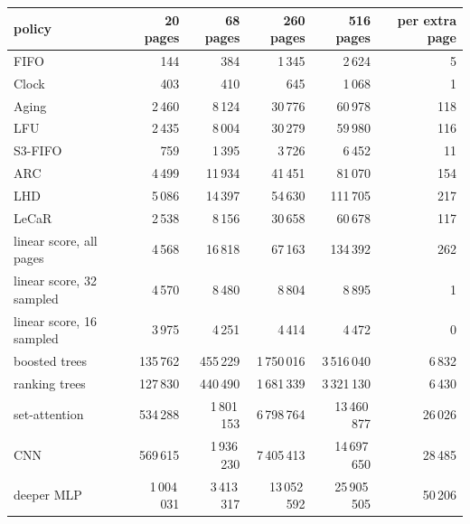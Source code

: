 \begin{tabular}{lrrrrr}
\toprule
policy & 20 pages & 68 pages & 260 pages & 516 pages & per extra page \\
\midrule
FIFO & 144 & 384 & 1\,345 & 2\,624 & 5 \\
Clock & 403 & 410 & 645 & 1\,068 & 1 \\
Aging & 2\,460 & 8\,124 & 30\,776 & 60\,978 & 118 \\
LFU & 2\,435 & 8\,004 & 30\,279 & 59\,980 & 116 \\
S3-FIFO & 759 & 1\,395 & 3\,726 & 6\,452 & 11 \\
ARC & 4\,499 & 11\,934 & 41\,451 & 81\,070 & 154 \\
LHD & 5\,086 & 14\,397 & 54\,630 & 111\,705 & 217 \\
LeCaR & 2\,538 & 8\,156 & 30\,658 & 60\,678 & 117 \\
linear score, all pages & 4\,568 & 16\,818 & 67\,163 & 134\,392 & 262 \\
linear score, 32 sampled & 4\,570 & 8\,480 & 8\,804 & 8\,895 & 1 \\
linear score, 16 sampled & 3\,975 & 4\,251 & 4\,414 & 4\,472 & 0 \\
boosted trees & 135\,762 & 455\,229 & 1\,750\,016 & 3\,516\,040 & 6\,832 \\
ranking trees & 127\,830 & 440\,490 & 1\,681\,339 & 3\,321\,130 & 6\,430 \\
set-attention & 534\,288 & 1\,801\,153 & 6\,798\,764 & 13\,460\,877 & 26\,026 \\
CNN & 569\,615 & 1\,936\,230 & 7\,405\,413 & 14\,697\,650 & 28\,485 \\
deeper MLP & 1\,004\,031 & 3\,413\,317 & 13\,052\,592 & 25\,905\,505 & 50\,206 \\
\bottomrule
\end{tabular}
